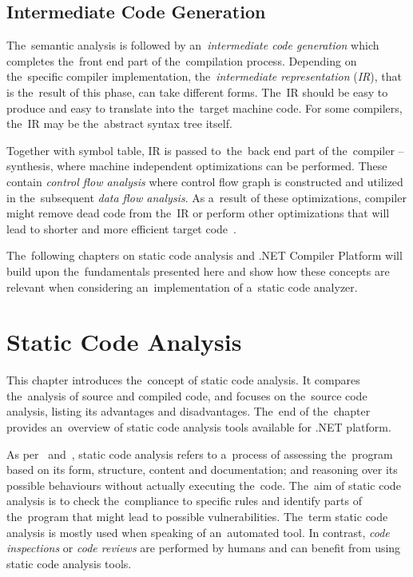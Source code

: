 \documentclass[
  digital, %
  table,   %
  lof,     %
  lot,     %
  oneside,
]{fithesis3}
\begin{document}
\section{Intermediate Code Generation}
The~semantic analysis is followed by an~\textit{intermediate code generation} which completes the~front end part of the~compilation process. Depending on the~specific compiler implementation, the~\textit{intermediate representation} (\textit{IR}), that is the~result of this phase, can take different forms. The~IR should be easy to produce and easy to translate into the~target machine code. For some compilers, the~IR may be the~abstract syntax tree itself.

Together with symbol table, IR is passed to~the~back end part of the~compiler -- synthesis, where machine independent optimizations can be performed. These contain \textit{control flow analysis} where control flow graph is constructed and utilized in the~subsequent \textit{data flow analysis}. As a~result of these optimizations, compiler might remove dead code from the~IR or perform other optimizations that will lead to shorter and more efficient target code~\cite{dragon-book}.

\bigskip
\noindent
The~following chapters on static code analysis and .NET Compiler Platform will build upon the~fundamentals presented here and show how these concepts are relevant when considering an~implementation of a~static code analyzer.

\chapter{Static Code Analysis}
\label{chap:static-code-analysis}
This chapter introduces the~concept of static code analysis. It compares the~analysis of source and compiled code, and focuses on the~source code analysis, listing its advantages and disadvantages. The~end of the~chapter provides an~overview of static code analysis tools available for .NET platform.

As per~\cite{sca-ppt} and~\cite{sca-approach-in-sw-dev}, static code analysis refers to a~process of assessing the~program based on its form, structure, content and documentation; and reasoning over its possible behaviours without actually executing the~code. The~aim of static code analysis is to check the~compliance to specific rules and identify parts of the~program that might lead to possible vulnerabilities. The~term static code analysis is mostly used when speaking of an~automated tool. In contrast, \textit{code inspections} or \textit{code reviews} are performed by humans and can benefit from using static code analysis tools.
\end{document}
